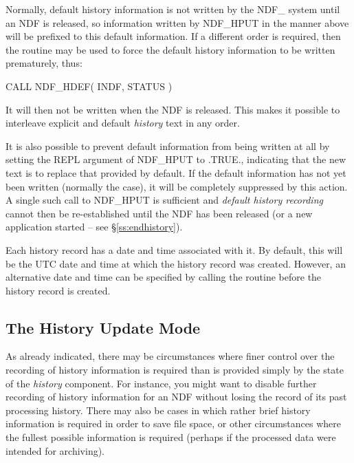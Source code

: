 \documentclass[twoside,11pt,nolof]{starlink}
\providecommand{\st}[1]{{\emph{#1}}}
\begin{document}
Normally, default history information is not written by the NDF\_
system until an NDF is released, so information written by NDF\_HPUT
in the manner above will be prefixed to this default information. If a
different order is required, then the routine  may be used to
force the default history information to be written prematurely, thus:

\small
\begin{terminalv}
      CALL NDF_HDEF( INDF, STATUS )
\end{terminalv}
\normalsize

It will then not be written when the NDF is released. This makes it
possible to interleave explicit and default \st{history\/} text in any order.

It is also possible to prevent default information from being written
at all by setting the REPL argument of NDF\_HPUT to .TRUE., indicating
that the new text is to replace that provided by default. If the
default information has not yet been written (normally the case), it
will be completely suppressed by this action. A single such call to
NDF\_HPUT is sufficient and \st{default history recording\/} cannot then be
re-established until the NDF has been released (or a new application
started -- see \S\ref{ss:endhistory}).

Each history record has a date and time associated with it. By default,
this will be the UTC date and time at which the history record was
created. However, an alternative date and time can be specified by
calling the  routine before the history
record is created.

\subsection{\label{ss:historyupdatemode}The History Update Mode}

As already indicated, there may be circumstances where finer control
over the recording of history information is required than is provided
simply by the state of the \st{history\/} component. For instance, you
might want to disable further recording of history information for an
NDF without losing the record of its past processing history. There
may also be cases in which rather brief history information is
required in order to save file space, or other circumstances where the
fullest possible information is required (perhaps if the processed
data were intended for archiving).
\end{document}
